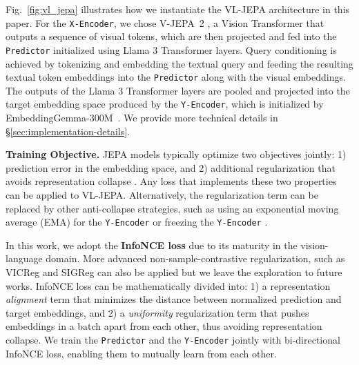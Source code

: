 
Fig.~\ref{fig:vl_jepa} illustrates how we instantiate the VL-JEPA architecture in this paper. For the \texttt{X-Encoder}, we chose V-JEPA~2 \citep{assran2025v}, a Vision Transformer that outputs a sequence of visual tokens, which are then projected and fed into the \texttt{Predictor} initialized using Llama 3 Transformer layers. Query conditioning is achieved by tokenizing and embedding the textual query and feeding the resulting textual token embeddings into the \texttt{Predictor} along with the visual embeddings. The outputs of the Llama 3 Transformer layers are pooled and projected into the target embedding space produced by the \texttt{Y-Encoder}, {which is initialized by EmbeddingGemma-300M}~\citep{vera2025embeddinggemma}. We provide more technical details in \S\ref{sec:implementation-details}.
 
\textbf{Training Objective.} JEPA models typically optimize two objectives jointly: 1) prediction error in the embedding space, and 2) additional regularization that avoids representation collapse \citep{bardes2021vicreg, balestriero2025lejepa}. Any loss that implements these two properties can be applied to VL-JEPA. Alternatively, the regularization term can be replaced by other anti-collapse strategies, such as using an exponential moving average (EMA) for the \texttt{Y-Encoder} \citep{assran2025v} or freezing the \texttt{Y-Encoder} \citep{zhou2025dino}.

In this work, {we adopt the \textbf{InfoNCE loss} \citep{radford2021learning} due to its maturity in the vision-language domain.} More advanced non-sample-contrastive regularization, such as VICReg \citep{bardes2021vicreg} and SIGReg \citep{balestriero2025lejepa} can also be applied but we leave the exploration to future works. {InfoNCE loss can be mathematically divided \citep{wang2020understanding} into: 1) a representation \textit{alignment} term that minimizes the distance between normalized prediction and target embeddings, and 2) a \textit{uniformity} regularization term that pushes embeddings in a batch apart from each other, thus avoiding representation collapse. We train the \texttt{Predictor} and the \texttt{Y-Encoder} jointly with bi-directional InfoNCE loss, enabling them to mutually learn from each other.}

